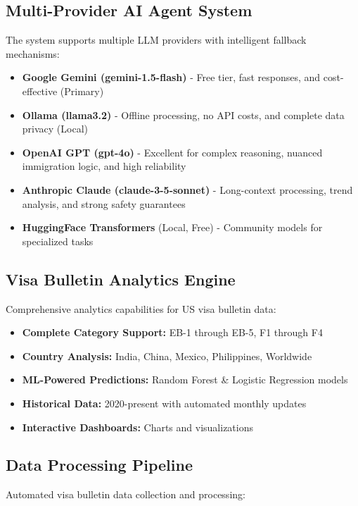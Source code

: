 \documentclass[11pt,a4paper]{article}
\newcommand{\tech}[1]{\textbf{#1}}
\begin{document}
\subsection{Multi-Provider AI Agent System}
The system supports multiple LLM providers with intelligent fallback mechanisms:

\begin{itemize}[itemsep=0.3em]
    \item \tech{Google Gemini (gemini-1.5-flash)} - Free tier, fast responses, and cost-effective (Primary)
    \item \tech{Ollama (llama3.2)} - Offline processing, no API costs, and complete data privacy (Local)
    \item \tech{OpenAI GPT (gpt-4o)} - Excellent for complex reasoning, nuanced immigration logic, and high reliability
    \item \tech{Anthropic Claude (claude-3-5-sonnet)} - Long-context processing, trend analysis, and strong safety guarantees
    \item \tech{HuggingFace Transformers} (Local, Free) - Community models for specialized tasks
\end{itemize}

\subsection{Visa Bulletin Analytics Engine}
Comprehensive analytics capabilities for US visa bulletin data:

\begin{itemize}[itemsep=0.3em]
    \item \textbf{Complete Category Support:} EB-1 through EB-5, F1 through F4
    \item \textbf{Country Analysis:} India, China, Mexico, Philippines, Worldwide
    \item \textbf{ML-Powered Predictions:} Random Forest \& Logistic Regression models
    \item \textbf{Historical Data:} 2020-present with automated monthly updates
    \item \textbf{Interactive Dashboards:} Charts and visualizations
\end{itemize}

\subsection{Data Processing Pipeline}
Automated visa bulletin data collection and processing:
\end{document}
